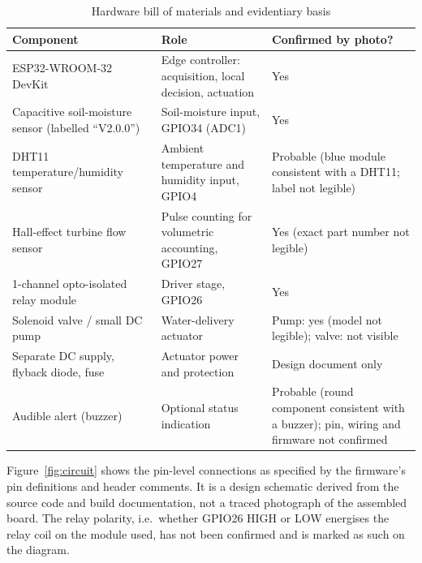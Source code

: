 \documentclass[conference]{IEEEtran}
\begin{document}
\begin{table}[t]
\caption{Hardware bill of materials and evidentiary basis}
\label{tab:bom}
\centering
\begin{tabular}{@{}p{}p{}p{}@{}}
\toprule
\textbf{Component} & \textbf{Role} & \textbf{Confirmed by photo?} \\
\midrule
ESP32-WROOM-32 DevKit & Edge controller: acquisition, local decision, actuation & Yes \\
Capacitive soil-moisture sensor (labelled ``V2.0.0'') & Soil-moisture input, GPIO34 (ADC1) & Yes \\
DHT11 temperature/humidity sensor & Ambient temperature and humidity input, GPIO4 & Probable (blue module consistent with a DHT11; label not legible) \\
Hall-effect turbine flow sensor & Pulse counting for volumetric accounting, GPIO27 & Yes (exact part number not legible) \\
1-channel opto-isolated relay module & Driver stage, GPIO26 & Yes \\
Solenoid valve / small DC pump & Water-delivery actuator & Pump: yes (model not legible); valve: not visible \\
Separate DC supply, flyback diode, fuse & Actuator power and protection & Design document only \\
Audible alert (buzzer) & Optional status indication & Probable (round component consistent with a buzzer); pin, wiring and firmware not confirmed \\
\bottomrule
\end{tabular}
\end{table}

Figure~\ref{fig:circuit} shows the pin-level connections as specified
by the firmware's pin definitions and header comments. It is a design
schematic derived from the source code and build documentation, not a
traced photograph of the assembled board. The relay polarity, i.e.\
whether GPIO26 HIGH or LOW energises the relay coil on the module used,
has not been confirmed and is marked as such on the diagram.
\end{document}
